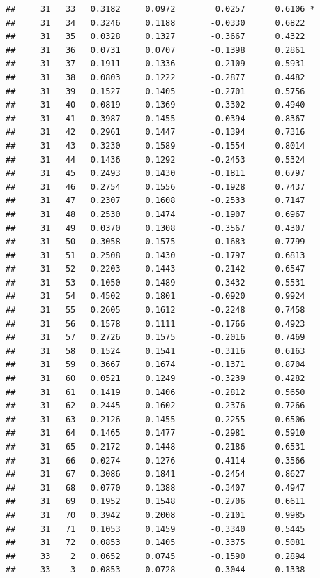 \documentclass[
]{article}
\begin{document}
\begin{verbatim}
##     31   33   0.3182     0.0972        0.0257      0.6106 *
##     31   34   0.3246     0.1188       -0.0330      0.6822  
##     31   35   0.0328     0.1327       -0.3667      0.4322  
##     31   36   0.0731     0.0707       -0.1398      0.2861  
##     31   37   0.1911     0.1336       -0.2109      0.5931  
##     31   38   0.0803     0.1222       -0.2877      0.4482  
##     31   39   0.1527     0.1405       -0.2701      0.5756  
##     31   40   0.0819     0.1369       -0.3302      0.4940  
##     31   41   0.3987     0.1455       -0.0394      0.8367  
##     31   42   0.2961     0.1447       -0.1394      0.7316  
##     31   43   0.3230     0.1589       -0.1554      0.8014  
##     31   44   0.1436     0.1292       -0.2453      0.5324  
##     31   45   0.2493     0.1430       -0.1811      0.6797  
##     31   46   0.2754     0.1556       -0.1928      0.7437  
##     31   47   0.2307     0.1608       -0.2533      0.7147  
##     31   48   0.2530     0.1474       -0.1907      0.6967  
##     31   49   0.0370     0.1308       -0.3567      0.4307  
##     31   50   0.3058     0.1575       -0.1683      0.7799  
##     31   51   0.2508     0.1430       -0.1797      0.6813  
##     31   52   0.2203     0.1443       -0.2142      0.6547  
##     31   53   0.1050     0.1489       -0.3432      0.5531  
##     31   54   0.4502     0.1801       -0.0920      0.9924  
##     31   55   0.2605     0.1612       -0.2248      0.7458  
##     31   56   0.1578     0.1111       -0.1766      0.4923  
##     31   57   0.2726     0.1575       -0.2016      0.7469  
##     31   58   0.1524     0.1541       -0.3116      0.6163  
##     31   59   0.3667     0.1674       -0.1371      0.8704  
##     31   60   0.0521     0.1249       -0.3239      0.4282  
##     31   61   0.1419     0.1406       -0.2812      0.5650  
##     31   62   0.2445     0.1602       -0.2376      0.7266  
##     31   63   0.2126     0.1455       -0.2255      0.6506  
##     31   64   0.1465     0.1477       -0.2981      0.5910  
##     31   65   0.2172     0.1448       -0.2186      0.6531  
##     31   66  -0.0274     0.1276       -0.4114      0.3566  
##     31   67   0.3086     0.1841       -0.2454      0.8627  
##     31   68   0.0770     0.1388       -0.3407      0.4947  
##     31   69   0.1952     0.1548       -0.2706      0.6611  
##     31   70   0.3942     0.2008       -0.2101      0.9985  
##     31   71   0.1053     0.1459       -0.3340      0.5445  
##     31   72   0.0853     0.1405       -0.3375      0.5081  
##     33    2   0.0652     0.0745       -0.1590      0.2894  
##     33    3  -0.0853     0.0728       -0.3044      0.1338  

\end{verbatim}
\end{document}
